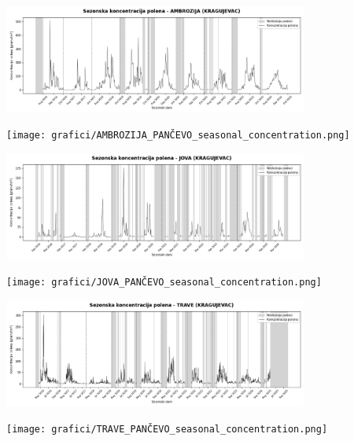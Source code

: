 \documentclass[12pt]{article}
\begin{document}
\begin{center}

\includegraphics[width=0.75\textwidth]{grafici/AMBROZIJA_KRAGUJEVAC_seasonal_concentration.png}
\vspace{0.5cm}

\texttt{[image: grafici/AMBROZIJA\_PANČEVO\_seasonal\_concentration.png]}
\vspace{0.5cm}

\includegraphics[width=0.75\textwidth]{grafici/JOVA_KRAGUJEVAC_seasonal_concentration.png}
\vspace{0.5cm}

\texttt{[image: grafici/JOVA\_PANČEVO\_seasonal\_concentration.png]}
\vspace{0.5cm}

\includegraphics[width=0.75\textwidth]{grafici/TRAVE_KRAGUJEVAC_seasonal_concentration.png}
\vspace{0.5cm}

\texttt{[image: grafici/TRAVE\_PANČEVO\_seasonal\_concentration.png]}
\vspace{0.5cm}

\label{fig:seasonal_concentration_centered}

\end{center}
\end{document}
